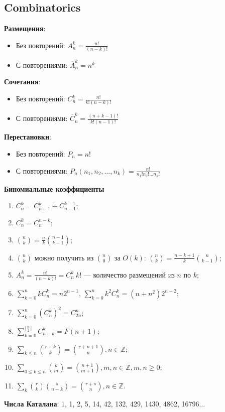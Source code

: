 \subsection{Combinatorics}
\textbf{Размещения}: 
\begin{itemize}
	\item Без повторений: $A_n^k = \frac{n!}{(n - k)!} $
	\item С повторениями: $\overline{A}_n^k = n^k $
\end{itemize}
\textbf{Сочетания}:
\begin{itemize}
	\item Без повторений: $C_n^k = \frac{n!}{k! (n - k)!}$
	\item С повторениями: $\overline{C}_n^k = \frac{(n + k - 1)!}{k! (n - 1)!} $
\end{itemize}
\textbf{Перестановки}:
\begin{itemize}
	\item Без повторений: $P_n = n!$
	\item С повторениями: $P_n(n_1, n_2, \dots, n_k) = \frac{n!}{n_1! n_2! \dots n_k!} $
\end{itemize}
\textbf{Биномиальные коэффициенты}
\begin{enumerate}
	\item $C_n^k = C_{n - 1}^k + C_{n - 1}^{k - 1} $;
	\item $C_n^k = C_{n}^{n - k} $;
	\item $\binom{n}{k}=\frac nk \binom{n-1}{k-1}$;
	\item $\binom{n}{k}$ можно получить из $\binom{n}{0}$ за $O(k)$: $\binom{n}{k}=\frac{n-k+1}k \binom{n}{k-1}$;
	\item $A_n^k=\frac{n!}{(n-k)!}=C_n^k\:k!$ --- количество размещений из $n$ по $k$;
	\item $\sum\limits_{k=0}^{n}k C_n^k=n2^{n-1}$, $\sum\limits_{k=0}^{n}k^2 C_n^k=(n+n^2)2^{n-2}$;
	\item $\sum\limits_{k=0}^{n}{(C_n^{k})^2}=C_{2n}^n$;
	\item $\sum\limits_{k=0}^{\lfloor\frac{n}{2}\rfloor}C_{n-k}^k=F(n+1)$;
	\item $\sum\limits_{k\le n} \binom{r+k}{k}=\binom{r+n+1}{n}, n\in \mathbb{Z}$;
	\item $\sum\limits_{0\le k\le n} \binom{k}{m} = \binom{n+1}{m+1}, m, n\in \mathbb{Z}, m, n\ge 0$;
	\item $\sum\limits_k \binom{r}{k}\binom{s}{n-k}=\binom{r+s}{n}, n\in \mathbb{Z}$.
\end{enumerate}
\textbf{Числа Каталана}:
1, 1, 2, 5, 14, 42, 132, 429, 1430, 4862, 16796...

